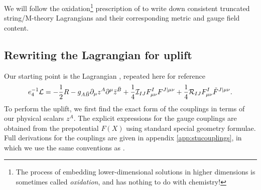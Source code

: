 We will follow the oxidation\footnote{The process of embedding lower-dimensional solutions in higher dimensions is sometimes called \emph{oxidation}, and has nothing to do with chemistry!} prescription of \cite{Chow:2014cca} to write down consistent truncated string/M-theory Lagrangians and their corresponding metric and gauge field content.

\subsection{Rewriting the Lagrangian for uplift}

Our starting point is the Lagrangian , repeated here for reference
\begin{equation*}
 e_4^{-1} {\cal L} = -\frac{1}{2}R - g_{A\bar{B}} \partial_\mu z^A \partial^\mu \bar{z}^{\bar{B}} + \frac{1}{4} {\cal I}_{IJ} F^I_{\mu \nu} F^{J|\mu \nu} + \frac{1}{4} {\cal R}_{IJ} F^I_{\mu \nu} \tilde{F}^{J|\mu \nu}.
\end{equation*}
To perform the uplift, we first find the exact form of the couplings in terms of our physical scalars $z^A$. The explicit expressions for the gauge couplings are obtained from the prepotential $F(X)$ using standard special geometry formulae. Full derivations for the couplings are given in appendix \ref{app:stucouplings}, in which we use the same conventions as \cite{Cortes:2009cs}.

